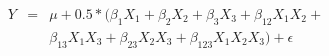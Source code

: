 

\[
\begin{array}{lll}Y & = & \mu + 0.5*(\beta_{1}X_1 + \beta_{2}X_{2} + \beta_{3}X_{3} + \beta_{12}X_{1}X_{2} + \\ & & \beta_{13}X_{1}X_{3} + \beta_{23}X_{2}X_{3} + \beta_{123}X_{1}X_{2}X_{3}) + \epsilon \end{array}
\]


